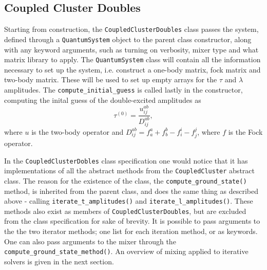     

    \subsection{Coupled Cluster Doubles}
    
    Starting from construction, the \lstinline{CoupledClusterDoubles} class passes 
    the system, defined through a \lstinline{QuantumSystem} object to the 
    parent class constructor, along with any keyword arguments, such as turning 
    on verbosity, mixer type and what matrix library to apply. The
    \lstinline{QuantumSystem} class will contain all the information necessary to 
    set up the system, i.e. construct a one-body matrix, fock matrix and two-body 
    matrix. These will be used to set up empty arrays for the $\tau$ and $\lambda$ 
    amplitudes. The \lstinline{compute_initial_guess} is called lastly in the 
    constructor, computing the inital guess of the double-excited amplitudes as 
    \begin{equation}
        \label{eq:ccd_inital_guess}
        \tau^{(0)} = \frac{u^{ab}_{ij}}{D^{ab}_{ij}},
    \end{equation}
    where $u$ is the two-body operator and
    $D^{ab}_{ij} = f^a_a + f^b_b - f^i_i - f^j_j$,
    where $f$ is the Fock operator.
    
    In the \lstinline{CoupledClusterDobles} class specification one would
    notice that it has implementations of all the abstract methods 
    from the \lstinline{CoupledCluster} abstract class. The reason for the existence 
    of the class, the \lstinline{compute_ground_state()} method, is inherited from the 
    parent class, and does the same thing as described above - calling 
    \lstinline{iterate_t_amplitudes()} and \lstinline{iterate_l_amplitudes()}. These 
    methods also exist as members of \lstinline{CoupledClusterDoubles}, but are excluded 
    from the class specification for sake of brevity. It is 
    possible to pass arguments to the the two iterator methods; one list for each iteration
    method, or as keywords.
    One can also pass arguments 
    to the mixer through the \lstinline{compute_ground_state_method()}. 
    An overview of mixing applied to iterative solvers is given in the next 
    section.

